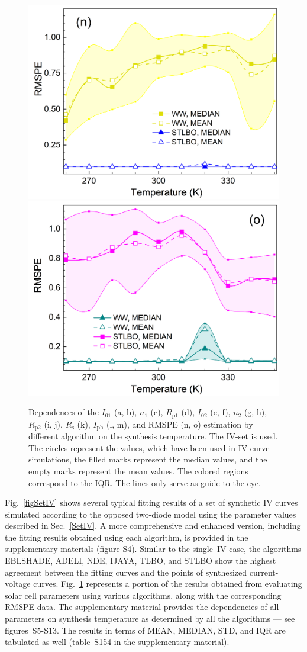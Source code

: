 \documentclass[a4paper,fleqn]{cas-dc}
\begin{document}
\begin{figure}[]
        \includegraphics[width=.32\textwidth]{AfigN}
        \includegraphics[width=.32\textwidth]{AfigO}
	  \caption{Dependences of the $I_{01}$ (a, b), $n_1$ (c), $R_\mathrm{p1}$ (d), $I_{02}$ (e, f),
               $n_2$ (g, h), $R_\mathrm{p2}$ (i, j), $R_\mathrm{s}$ (k), $I_\mathrm{ph}$ (l, m), and RMSPE (n, o)
               estimation by different algorithm on the synthesis temperature.
               The IV-set is used.
               The circles represent the values, which have been used in IV curve simulations,
               the filled marks represent the median values, and the empty marks represent the mean values.
               The colored regions correspond to the IQR.
               The lines only serve as guide to the eye.
               }\label{figTDepIVset}
\end{figure}

Fig.~\ref{figSetIV} shows several typical fitting results of a set of synthetic IV curves
simulated according to the opposed two-diode model using the parameter values described in Sec.~\ref{SetIV}.
A more comprehensive and enhanced version, including the fitting results obtained using each algorithm,
is provided in the supplementary materials (figure S4).
Similar to the single--IV case,
the algorithms EBLSHADE, ADELI, NDE, IJAYA, TLBO, and STLBO show
the highest agreement between the fitting curves and the points of synthesized current-voltage curves.
Fig.~\ref{figTDepIVset} represents a portion of the results obtained from evaluating solar cell parameters using various algorithms,
along with the corresponding RMSPE data.
The supplementary material provides the dependencies of all parameters on synthesis temperature
as determined by all the algorithms --- see figures~S5-S13.
The results in terms of MEAN, MEDIAN, STD, and IQR are tabulated as well (table~S154 in the supplementary material).
\end{document}

